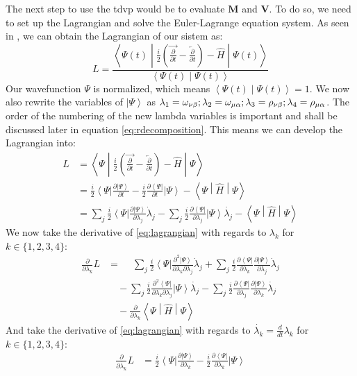 \documentclass{aux/ttuthes2007}
\newcommand{\bra}[1]{\ensuremath{\left\langle#1\right\vert}}
\newcommand{\ket}[1]{\ensuremath{\left|#1\right\rangle}}
\newcommand{\braket}[2]{\left< #1 \middle\vert #2 \right>}
\newcommand{\sandwich}[3]{\left< #1 \middle\vert #2 \middle\vert #3 \right>}
\newcommand{\dd}[1]{\frac{d}{d#1}}
\newcommand{\pd}[1]{\frac{\partial}{\partial #1}}
\newcommand{\kpp}[1]{\frac{\partial \ket\Psi}{\partial #1}}
\newcommand{\bpp}[1]{\frac{\partial \bra\Psi}{\partial #1}}
\newcommand{\kppd}[2]{\frac{\partial^{2} \ket\Psi}{\partial #1 \partial #2}}
\newcommand{\bppd}[2]{\frac{\partial^{2} \bra\Psi}{\partial #1 \partial #2}}
\newcommand{\ind}[1]{{\uo #1 \oo #1}}
\newcommand{\uo}[1]{
		\IfEqCase{#1}{
			{0}{\mu}
			{1}{\nu}
			{2}{\xi}
		}[\PackageError{uo}{Undefined option to uo: #1}{}]
}
\newcommand{\oo}[1]{
		\IfEqCase{#1}{
			{0}{\alpha}
			{1}{\beta}
			{2}{\gamma}
		}[\PackageError{unocorb}{Undefined option to unuo: #1}{}]
}
\begin{document}
The next step to use the \gls{tdvp} would be to evaluate $\bm M$ and $\bm V$. To do so, we need to set up the Lagrangian and solve the Euler-Lagrange equation system.
As seen in \cite{benjamin}, we can obtain the Lagrangian of our sistem as:
\[
	L = \frac{\sandwich{\Psi(t)}{\frac{i}{2}\left(\overrightarrow{\pd t} - \overleftarrow{\pd t}\right) - \hat H}{\Psi(t)}}{\braket{\Psi(t)}{\Psi(t)}}
\]
%
Our wavefunction $\Psi$ is normalized, which means $\braket{\Psi(t)}{\Psi(t)} = 1$. We now also rewrite the variables of $\ket{\Psi}$ as 
$\lambda_1 = \omega_\ind 1; \lambda_2 = \omega_\ind 0; \lambda_3 = \rho_\ind 1; \lambda_4 = \rho_\ind 0$.
The order of the numbering of the new lambda variables is important and shall be discussed later in equation \ref{eq:rdecomposition}. 
This means we can develop the Lagrangian into:
\begin{equation}
	\begin{split}
		\label{eq:lagrangian}
		L &= \sandwich{\Psi}{\frac{i}{2}\left(\overrightarrow{\pd t} - \overleftarrow{\pd t}\right) - \hat H}{\Psi} \\
		  &= \frac{i}{2}\bra{\Psi}{\kpp t} - \frac{i}{2}{\bpp{t}}\ket{\Psi} - \sandwich{\Psi}{\hat H}{\Psi} \\
		  &= 	
			\sum_j \frac{i}{2}\bra{\Psi}{\kpp {\lambda_j}} \dot \lambda_j
		- 	\sum_j \frac{i}{2}{\bpp{\lambda_j}}\ket{\Psi}\dot{\lambda_j}
		- \sandwich{\Psi}{\hat H}{\Psi}
	\end{split}
\end{equation}
%
We now take the derivative of \ref{eq:lagrangian} with regards to $\lambda_k$ for $k \in \{1, 2, 3, 4\}$:
%
\begin{equation*}
	\begin{split}
	\pd{\lambda_k} L &= 	
	\phantom{-}\sum_j \frac{i}{2}\bra{\Psi}{\kppd {\lambda_k}{\lambda_j}} \dot \lambda_j
	+	\sum_j \frac{i}{2}\bpp{\lambda_k}{\kpp {\lambda_j}} \dot \lambda_j \\
	&\quad -\sum_j \frac{i}{2}{\bppd{\lambda_k}{\lambda_j}}\ket{\Psi}\dot{\lambda_j}
	- 	\sum_j \frac{i}{2}{\bpp{\lambda_j}}\kpp{\lambda_k}\dot{\lambda_j}\\
	&\quad -\pd{\lambda_k} \sandwich{\Psi}{\hat H}{\Psi}
	\end{split}
\end{equation*}
%
And take the derivative of \ref{eq:lagrangian} with regards to $\dot{\lambda_k} = \dd{t} \lambda_k$ for $k \in \{1, 2, 3, 4\}$:
%
\begin{equation*}
	\begin{split}
		\label{euler-lagrange}
		\pd{\dot{\lambda_k}} L &=
		\frac{i}{2}\bra{\Psi}{\kpp {\lambda_k}}
	- 	\frac{i}{2}{\bpp{\lambda_k}}\ket{\Psi}
	\end{split}
\end{equation*}
\end{document}
